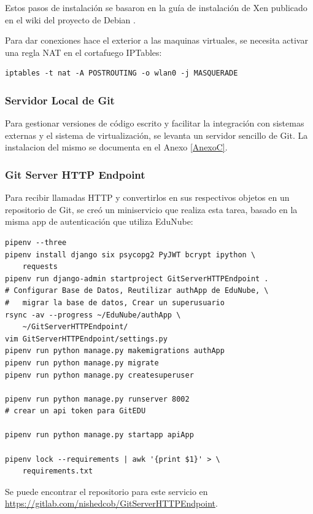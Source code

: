 Estos pasos de instalación se basaron en la guía de instalación de Xen publicado en el wiki del proyecto de Debian \citep{Debian-Wiki-Xen}.

Para dar conexiones hace el exterior a las maquinas virtuales, se necesita activar una regla NAT en el cortafuego IPTables:

\begin{lstlisting}[breaklines=true]
	iptables -t nat -A POSTROUTING -o wlan0 -j MASQUERADE
\end{lstlisting}

 
\subsubsection{Servidor Local de Git}
Para gestionar versiones de código escrito y facilitar la integración con sistemas externas y el sistema de virtualización, se levanta un servidor sencillo de Git. La instalacion del mismo se documenta en el Anexo \ref{AnexoC}.

 
\subsubsection{Git Server HTTP Endpoint}
Para recibir llamadas HTTP y convertirlos en sus respectivos objetos en un repositorio de Git, se creó un miniservicio que realiza esta tarea, basado en la misma app de autenticación que utiliza EduNube:
\begin{lstlisting}
pipenv --three
pipenv install django six psycopg2 PyJWT bcrypt ipython \
	requests
pipenv run django-admin startproject GitServerHTTPEndpoint .
# Configurar Base de Datos, Reutilizar authApp de EduNube, \
#	migrar la base de datos, Crear un superusuario
rsync -av --progress ~/EduNube/authApp \
	~/GitServerHTTPEndpoint/
vim GitServerHTTPEndpoint/settings.py
pipenv run python manage.py makemigrations authApp
pipenv run python manage.py migrate
pipenv run python manage.py createsuperuser

pipenv run python manage.py runserver 8002
# crear un api token para GitEDU

pipenv run python manage.py startapp apiApp

pipenv lock --requirements | awk '{print $1}' > \
	requirements.txt
\end{lstlisting}

Se puede encontrar el repositorio para este servicio en \url{https://gitlab.com/nishedcob/GitServerHTTPEndpoint}.

